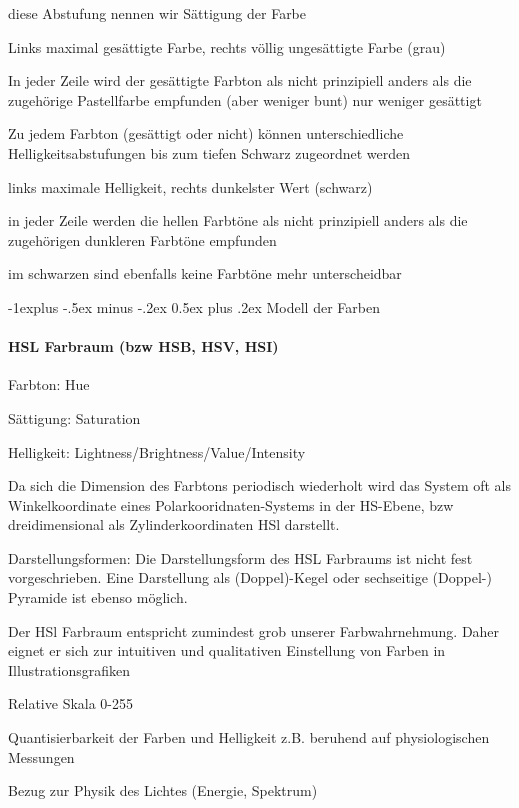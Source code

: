 \documentclass[landscape]{article}
\makeatletter
\renewcommand{\subsection}{\@startsection{subsection}{2}{0mm}%
                                {-1explus -.5ex minus -.2ex}%
                                {0.5ex plus .2ex}%
                                {\normalfont\normalsize\bfseries}}
\makeatother
\begin{document}
\begin{multicols}{3}
\begin{description}
\begin{itemize*}
            \item diese Abstufung nennen wir Sättigung der Farbe
            \item Links maximal gesättigte Farbe, rechts völlig ungesättigte Farbe (grau)
            \item In jeder Zeile wird der gesättigte Farbton als nicht prinzipiell anders als die zugehörige Pastellfarbe empfunden (aber weniger bunt) nur weniger gesättigt
          \end{itemize*}
    \item[Helligkeitsstufen (Lightness)]
          \begin{itemize*}
            \item  Zu jedem Farbton (gesättigt oder nicht) können unterschiedliche Helligkeitsabstufungen bis zum tiefen Schwarz zugeordnet werden
            \item links maximale Helligkeit, rechts dunkelster Wert (schwarz)
            \item in jeder Zeile werden die hellen Farbtöne als nicht prinzipiell anders als die zugehörigen dunkleren Farbtöne empfunden
            \item im schwarzen sind ebenfalls keine Farbtöne mehr unterscheidbar
          \end{itemize*}
  \end{description}
  
  \subsection{Modell der Farben}
  \paragraph{HSL Farbraum (bzw HSB, HSV, HSI)}
  \begin{itemize*}
    \item Farbton: Hue
    \item Sättigung: Saturation
    \item Helligkeit: Lightness/Brightness/Value/Intensity
    \item Da sich die Dimension des Farbtons periodisch wiederholt wird das System oft als Winkelkoordinate eines Polarkooridnaten-Systems in der HS-Ebene, bzw dreidimensional als Zylinderkoordinaten HSl darstellt.
    \item Darstellungsformen: Die Darstellungsform des HSL Farbraums ist nicht fest vorgeschrieben. Eine Darstellung als (Doppel)-Kegel oder sechseitige (Doppel-) Pyramide ist ebenso möglich.
    \item Der HSl Farbraum entspricht zumindest grob unserer Farbwahrnehmung. Daher eignet er sich zur intuitiven und qualitativen Einstellung von Farben in Illustrationsgrafiken
    \item Relative Skala 0-255
    \item Quantisierbarkeit der Farben und Helligkeit z.B. beruhend auf physiologischen Messungen
    \item Bezug zur Physik des Lichtes (Energie, Spektrum)
  \end{itemize*}

\end{multicols}
\end{document}

